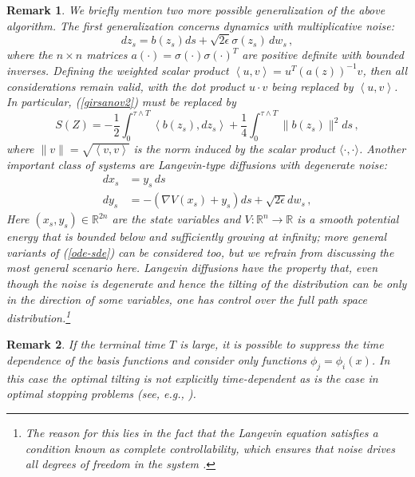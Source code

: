 \documentclass[final]{siamltex}
\newcommand{\R}{{\mathbb R}}
\newcommand{\eps}{\epsilon}
\newcommand{\bk}[2]{\left\langle #1,#2\right\rangle}
\newcommand{\ip}{\langle\cdot,\cdot\rangle}
\newtheorem{remark}{Remark}
\begin{document}
\begin{remark}
  \label{remark-general}
  We briefly mention two more possible generalization of the above algorithm. 
The first generalization concerns dynamics with multiplicative noise: 
      \begin{equation}
      d z_s = b(z_s) ds + \sqrt{2\eps } \sigma(z_s)\,dw_s\,, 
    \label{dynamics-1-sigma}
    \end{equation}
    where the $n \times n$  matrices $a(\cdot) = \sigma(\cdot)\sigma(\cdot)^T$  are positive definite with bounded inverses. Defining the weighted scalar product $\bk{u}{v}=u^{T} (a(z))^{-1}v$, then all considerations remain valid, with the dot product $u\cdot v$ being replaced by $\bk{u}{v}$. In particular, (\ref{girsanov2}) must be replaced by 
       \begin{equation}\label{I-1-sigma}
  S(Z) = -\frac{1}{2}\int_0^{\tau\wedge T} \bk{b(z_s)}{dz_s} +
  \frac{1}{4}\int_0^{\tau\wedge T} \|b(z_s)\|^2ds \,,
\end{equation}
     where  $\|v\|=\sqrt{\bk{v}{v}}$ is the norm induced by the scalar product $\ip$. 
%   
Another important class of systems are Langevin-type diffusions with degenerate noise:  
      \begin{equation}
      \begin{aligned}
	dx_s & = y_s\, ds \\
	dy_s & = -\left(\nabla V(x_s) + y_{s}\right)  ds + \sqrt{2\eps } dw_s\,,
      \end{aligned}
      \label{ode-sde}
      \end{equation}
      Here $(x_s,y_{s}) \in \mathbb{R}^{2n}$ are the state variables and $V\colon\R^{n}\to\R$ is a smooth potential energy that is bounded below 
      and sufficiently growing at infinity; more general variants of (\ref{ode-sde}) can be considered too, but we refrain from discussing the most general scenario here. 
      Langevin diffusions have the 
      property that, even though the noise is degenerate and hence the tilting of the distribution can be only in the direction of some variables, one has control over the full path space distribution.\footnote{The reason for this lies in the fact that the Langevin equation satisfies a condition known as \emph{complete controllability}, which ensures that noise drives all degrees of freedom in the system \cite{mattingly2002}.} 
      \end{remark}
      
      \begin{remark}
      If the terminal time $T$ is large, it is possible to suppress the time dependence of the basis functions
      and consider only functions $\phi_{j}=\phi_{i}(x)$. In this case the optimal tilting is not explicitly time-dependent as is the case in 
      optimal stopping problems (see, e.g., \cite{Shiryaev2006}).    
      \end{remark}
\end{document}
